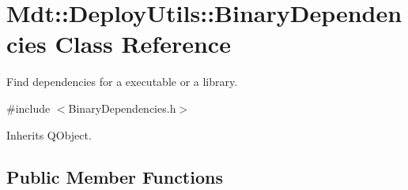 \hypertarget{class_mdt_1_1_deploy_utils_1_1_binary_dependencies}{}\section{Mdt\+:\+:Deploy\+Utils\+:\+:Binary\+Dependencies Class Reference}
\label{class_mdt_1_1_deploy_utils_1_1_binary_dependencies}


Find dependencies for a executable or a library.  




{\ttfamily \#include $<$Binary\+Dependencies.\+h$>$}



Inherits Q\+Object.

\subsection*{Public Member Functions}
